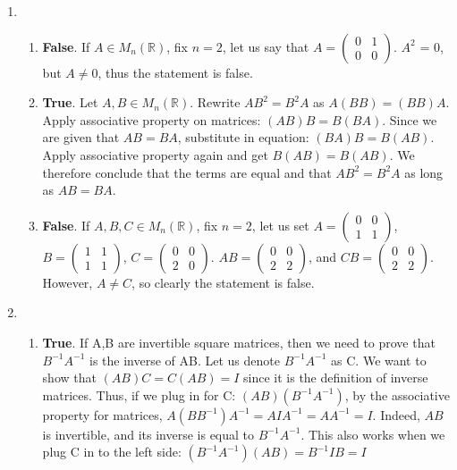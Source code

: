 \documentclass{article}
\begin{document}
\begin{enumerate}
\item

\begin{enumerate}

\item \textbf{False}. If  $A \in M_{n}(\mathbb{R})$, fix $n = 2$, let us say that $A =  \left(\begin{array}{cc} 0 & 1 \\ 0 & 0 \end{array} \right)$. $A^{2}$ = 0, but $A \neq 0$, thus the statement is false.
\item \textbf{True}. Let $A,B \in M_{n}(\mathbb{R})$. Rewrite $AB^{2} = B^{2}A$ as $A(BB) = (BB)A$. Apply associative property on matrices: $(AB)B = B(BA)$. Since we are given that $AB = BA$, substitute in equation: $(BA)B = B(AB)$. Apply associative property again and get $B(AB) = B(AB)$. We therefore conclude that the terms are equal and that $AB^2 = B^2A$ as long as $AB = BA$.
\item \textbf{False}. If $A,B,C \in M_{n}(\mathbb{R})$, fix $n = 2$, let us set
$A = \left(\begin{array}{cc} 0 & 0 \\ 1 & 1 \end{array} \right)$,
$B = \left(\begin{array}{cc} 1 & 1 \\ 1 & 1 \end{array} \right)$,
$C = \left(\begin{array}{cc} 0 & 0 \\ 2 & 0 \end{array} \right)$.
$AB = \left(\begin{array}{cc} 0 & 0 \\ 2 & 2 \end{array} \right)$, and $CB = \left(\begin{array}{cc} 0 & 0 \\ 2 & 2 \end{array} \right)$. However, $A \neq C$, so clearly the statement is false.

\end{enumerate}

\item

\begin{enumerate}

\item \textbf{True}. If A,B are invertible square matrices, then we need to prove that $B^{-1}A^{-1}$ is the inverse of AB. Let us denote $B^{-1}A^{-1}$ as C. We want to show that $(AB)C = C(AB) = I$ since it is the definition of inverse matrices. Thus, if we plug in for C: $(AB)(B^{-1}A^{-1})$, by the associative property for matrices, $A(BB^{-1})A^{-1} = AIA^{-1} = AA^{-1} = I$. Indeed, $AB$ is invertible, and its inverse is equal to $B^{-1}A^{-1}$. This also works when we plug C in to the left side: $(B^{-1}A^{-1})(AB) = B^{-1}IB = I$


\end{enumerate}
\end{enumerate}
\end{document}
